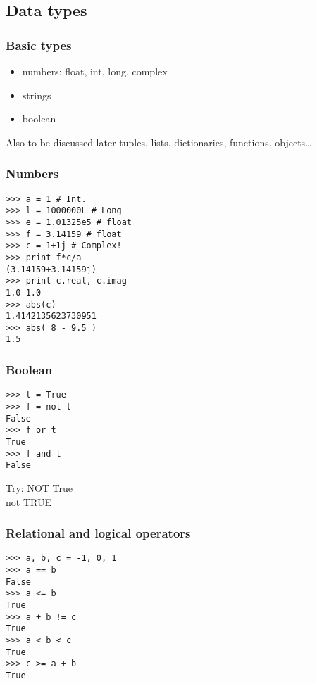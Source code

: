 \documentclass[14pt,compress]{beamer}
\begin{document}

\subsection{Data types}
\begin{frame}
  \frametitle{Basic types}
  \begin{itemize}
    \item numbers: float, int, long, complex
    \item strings
    \item boolean
  \end{itemize}
  \begin{block}{Also to be discussed later}
    tuples, lists, dictionaries, functions, objects\ldots
  \end{block}
\end{frame}

\begin{frame}[fragile]
  \frametitle{Numbers}
  \vspace*{-0.25in}
  \begin{lstlisting}
>>> a = 1 # Int.
>>> l = 1000000L # Long
>>> e = 1.01325e5 # float
>>> f = 3.14159 # float
>>> c = 1+1j # Complex!
>>> print f*c/a
(3.14159+3.14159j)
>>> print c.real, c.imag
1.0 1.0
>>> abs(c)
1.4142135623730951
>>> abs( 8 - 9.5 )
1.5
  \end{lstlisting}
\end{frame}

\begin{frame}[fragile]
  \frametitle{Boolean}
  \begin{lstlisting}
>>> t = True
>>> f = not t
False
>>> f or t
True
>>> f and t
False
  \end{lstlisting}
  \begin{block}{Try:}
  NOT True\\
  not TRUE
  \end{block}
\end{frame}

\begin{frame}[fragile]
  \frametitle{Relational and logical operators}
  \begin{lstlisting}
>>> a, b, c = -1, 0, 1
>>> a == b
False
>>> a <= b 
True
>>> a + b != c
True
>>> a < b < c
True
>>> c >= a + b
True
  \end{lstlisting}
\end{frame}
\end{document}

